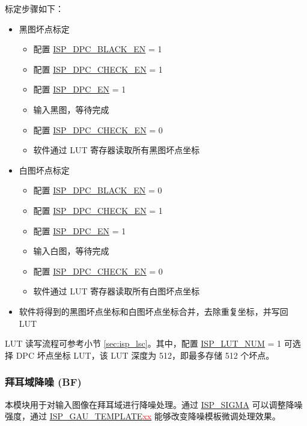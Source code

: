 \documentclass[main\_\_CN.tex]{subfiles}
\begin{document}
标定步骤如下：
\begin{itemize}
    \item 黑图坏点标定
        \begin{itemize}
            \item 配置 \hyperref[fielddesc:ISPDPCBLACKEN]{ISP\_DPC\_BLACK\_EN} = 1
            \item 配置 \hyperref[fielddesc:ISPDPCCHECKEN]{ISP\_DPC\_CHECK\_EN} = 1
            \item 配置 \hyperref[fielddesc:ISPDPCEN]{ISP\_DPC\_EN} = 1
            \item 输入黑图，等待完成
            \item 配置 \hyperref[fielddesc:ISPDPCCHECKEN]{ISP\_DPC\_CHECK\_EN} = 0
            \item 软件通过 LUT 寄存器读取所有黑图坏点坐标
        \end{itemize}
    \item 白图坏点标定
        \begin{itemize}
            \item 配置 \hyperref[fielddesc:ISPDPCBLACKEN]{ISP\_DPC\_BLACK\_EN} = 0
            \item 配置 \hyperref[fielddesc:ISPDPCCHECKEN]{ISP\_DPC\_CHECK\_EN} = 1
            \item 配置 \hyperref[fielddesc:ISPDPCEN]{ISP\_DPC\_EN} = 1
            \item 输入白图，等待完成
            \item 配置 \hyperref[fielddesc:ISPDPCCHECKEN]{ISP\_DPC\_CHECK\_EN} = 0
            \item 软件通过 LUT 寄存器读取所有白图坏点坐标
        \end{itemize}
    \item 软件将得到的黑图坏点坐标和白图坏点坐标合并，去除重复坐标，并写回 LUT
\end{itemize}

LUT 读写流程可参考小节 \ref{sec:isp_lsc}。其中，配置 \hyperref[fielddesc:ISPLUTNUM]{ISP\_LUT\_NUM} = 1 可选择 DPC 坏点坐标 LUT，该 LUT 深度为 512，即最多存储 512 个坏点。

\subsubsection{拜耳域降噪 (BF)}
\label{sec:isp_bf}
本模块用于对输入图像在拜耳域进行降噪处理。通过 \hyperref[fielddesc:ISPSIGMA]{ISP\_SIGMA} 可以调整降噪强度，通过 \hyperref[fielddesc:ISPGAUTEMPLATE00]{ISP\_GAU\_TEMPLATE\textcolor{red}{xx}} 能够改变降噪模板微调处理效果。
\end{document}
